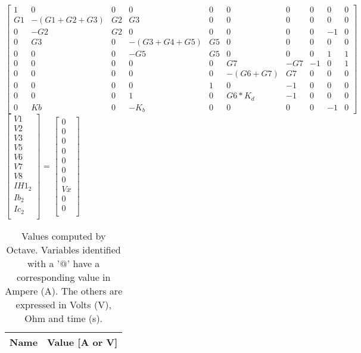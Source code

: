 {\footnotesize

$ \begin{bmatrix}
1 & 0 & 0 & 0 & 0 & 0 & 0 & 0 & 0 & 0 \\
G1 & -(G1+G2+G3) & G2 & G3 & 0 & 0 & 0 & 0 & 0 & 0 \\
0 & -G2 & G2 & 0 & 0 & 0 & 0 & 0 & -1 & 0 \\
0 & G3 & 0 & -(G3+G4+G5) & G5 & 0 & 0 & 0 & 0 & 0 \\
0 & 0 & 0 & -G5 & G5 & 0 & 0 & 0 & 1 & 1 \\
0 & 0 & 0 & 0 & 0 & G7 & -G7 & -1 & 0 & 1 \\
0 & 0 & 0 & 0 & 0 & -(G6+G7) & G7 & 0 & 0 & 0 \\
0 & 0 & 0 & 0 & 1 & 0 & -1 & 0 & 0 & 0 \\
0 & 0 & 0 & 1 & 0 & G6*K_d & -1 & 0 & 0 & 0 \\
0 & Kb & 0 & -K_b & 0 & 0 & 0 & 0 & -1 & 0 
\end{bmatrix}  $
$ \begin{bmatrix}
V1 \\
V2 \\
V3 \\
V5 \\
V6 \\
V7 \\
V8 \\
IH1_2 \\
Ib_2 \\
Ic_2 \\
\end{bmatrix}  $
=
$ \begin{bmatrix}
0 \\
0 \\
0 \\
0 \\
0 \\
0 \\
0 \\
Vx \\
0 \\
0 \\
\end{bmatrix}  $
}


\begin{table}[ht]
	\centering
	\begin{tabular}{|l|r|}
    		\hline    
    		{\bf Name} & {\bf Value [A or V]} \\ \hline
    		
  	\end{tabular}
  	\caption{Values computed by Octave. Variables identified with a '$@$' have a
  	corresponding value in Ampere (A). The others are expressed in Volts (V), Ohm and time (s).}
 
\label{tab:node}
\end{table}


